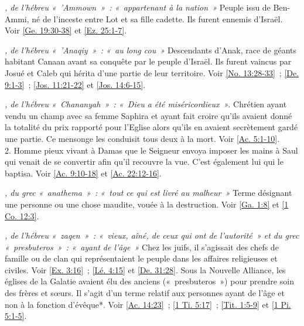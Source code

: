 \begin{multicols}{2}
\textit{, de l'hébreu «~'Ammown~»~: «~appartenant à la nation~»}\newline
Peuple issu de Ben-Ammi, né de l'inceste entre Lot et sa fille cadette. Ils furent ennemis d'Israël.\newline
Voir \vref{Ge. 19:30-38} et \vref{Ez. 25:1-7}.

\textit{, de l'hébreu «~'Anaqiy~»~: «~au long cou~»}\newline
Descendants d'Anak, race de géants habitant Canaan avant sa conquête par le peuple d'Israël. Ils furent vaincus par Josué et Caleb qui hérita d'une partie de leur territoire.\newline
Voir \vref{No. 13:28-33}~; \vref{De. 9:1-3}~; \vref{Jos. 11:21-22} et \vref{Jos. 14:6-15}.

\textit{, de l'hébreu «~Chananyah~»~: «~Dieu a été miséricordieux~»}. Chrétien ayant vendu un champ avec sa femme Saphira et ayant fait croire qu'ils avaient donné la totalité du prix rapporté pour l'Eglise alors qu'ils en avaient secrètement gardé une partie. Ce mensonge les conduisit tous deux à la mort. Voir \vref{Ac. 5:1-10}.
\\2. Homme pieux vivant à Damas que le Seigneur envoya imposer les mains à Saul qui venait de se convertir afin qu'il recouvre la vue. C'est également lui qui le baptisa.\newline
Voir \vref{Ac. 9:10-18} et \vref{Ac. 22:12-16}.

\textit{, du grec «~anathema~»~: «~tout ce qui est livré au malheur~»}\newline
Terme désignant une personne ou une chose maudite, vouée à la destruction.\newline
Voir \vref{Ga. 1:8} et \vref{1 Co. 12:3}.

\textit{, de l'hébreu «~zaqen~»~: «~vieux, aîné, de ceux qui ont de l'autorité~» et du grec «~presbuteros~»~: «~ayant de l'âge~»}\newline
Chez les juifs, il s'agissait des chefs de famille ou de clan qui représentaient le peuple dans les affaires religieuses et civiles. Voir \vref{Ex. 3:16}~; \vref{Lé. 4:15} et \vref{De. 31:28}. Sous la Nouvelle Alliance, les églises de la Galatie avaient élu des anciens («~presbuteros~») pour prendre soin des frères et sœurs. Il s'agit d'un terme relatif aux personnes ayant de l'âge et non à la fonction d'évêque*.\newline
Voir \vref{Ac. 14:23}~; \vref{1 Ti. 5:17}~; \vref{Tit. 1:5-9} et \vref{1 Pi. 5:1-5}.


\end{multicols}
